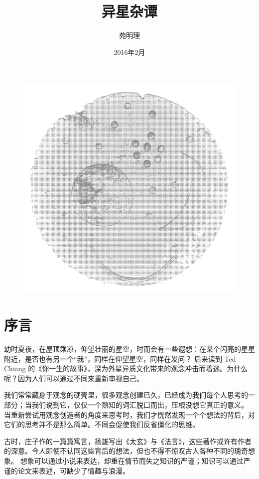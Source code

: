 \documentclass[a4paper,10.5pt]{article}
\title{异星杂谭}
\author{苑明理}
\date{2016年2月}
\begin{document}
\maketitle{}


\begin{figure}[ht]
\centering
\includegraphics[width=4.5in]{images/0_00-Cover.png}
\end{figure}


\newpage
\renewcommand\contentsname{目录}
\setcounter{tocdepth}{2}
\tableofcontents

\newpage

\section{序言}

幼时夏夜，在屋顶乘凉，仰望壮丽的星空，时而会有一些遐想：在某个闪亮的星星附近，是否也有另一个“我”，同样在仰望星空，同样在发问？
后来读到 Ted Chiang 的《你一生的故事》，深为外星异质文化带来的观念冲击而着迷。为什么呢？因为人们可以通过不同来重新审视自己。

我们常常藏身于观念的硬壳里，很多观念创建已久，已经成为我们每个人思考的一部分；当我们说到它，仅仅一个熟知的词汇脱口而出，压根没想它真正的意义。
当重新尝试用观念创造者的角度来思考时，我们才恍然发现一个个想法的背后，对它们的思考并不是那么简单。不同会促使我们反省僵化的思维。

古时，庄子作的一篇篇寓言，扬雄写出《太玄》与《法言》，这些著作或许有作者的深意。今人即使不认同这些背后的想法，但也不得不惊叹古人各种不同的瑰奇想象。
想象可以通过小说来表达，却重在情节而失之知识的严谨；知识可以通过严谨的论文来表述，可缺少了情趣与浪漫。
\end{document}

